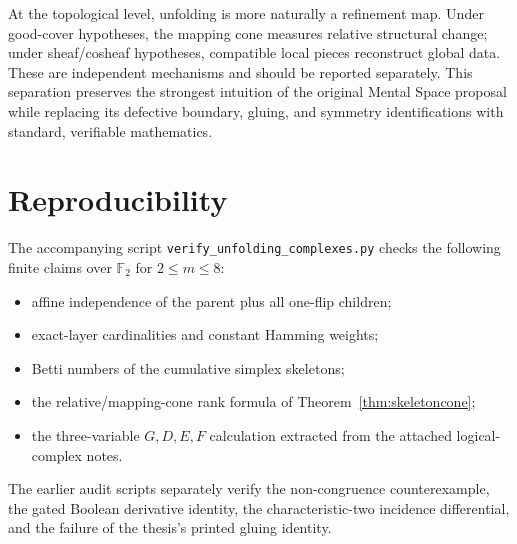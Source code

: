 \documentclass[11pt]{article}
\newcommand{\Ftwo}{\mathbb F_2}
\begin{document}
At the topological level, unfolding is more naturally a refinement map.  Under good-cover hypotheses, the mapping cone measures relative structural change; under sheaf/cosheaf hypotheses, compatible local pieces reconstruct global data.  These are independent mechanisms and should be reported separately.  This separation preserves the strongest intuition of the original Mental Space proposal while replacing its defective boundary, gluing, and symmetry identifications with standard, verifiable mathematics.

\appendix
\section{Reproducibility}
The accompanying script \texttt{verify\_unfolding\_complexes.py} checks the following finite claims over $\Ftwo$ for $2\le m\le8$:
\begin{itemize}
\item affine independence of the parent plus all one-flip children;
\item exact-layer cardinalities and constant Hamming weights;
\item Betti numbers of the cumulative simplex skeletons;
\item the relative/mapping-cone rank formula of Theorem~\ref{thm:skeletoncone};
\item the three-variable $G,D,E,F$ calculation extracted from the attached logical-complex notes.
\end{itemize}
The earlier audit scripts separately verify the non-congruence counterexample, the gated Boolean derivative identity, the characteristic-two incidence differential, and the failure of the thesis's printed gluing identity.
\end{document}
